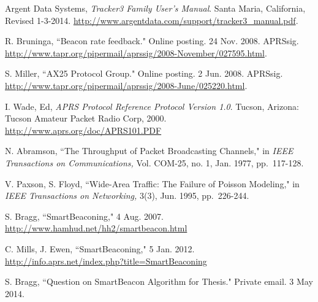 \begin{thebibliography}{99}


		Argent Data Systems,
		\emph{Tracker3 Family User's Manual}.
		Santa Maria, California,
		Revised 1-3-2014.
		\url{http://www.argentdata.com/support/tracker3_manual.pdf}.

		R. Bruninga,
		``Beacon rate feedback."
		Online posting. 24 Nov. 2008. APRSsig.
		\url{http://www.tapr.org/pipermail/aprssig/2008-November/027595.html}.

		S. Miller,
		``AX25 Protocol Group."
		Online posting. 2 Jun. 2008. APRSsig.
		\url{http://www.tapr.org/pipermail/aprssig/2008-June/025220.html}.

		I. Wade, Ed,
		\emph{APRS Protocol Reference Protocol Version 1.0}.
		Tucson, Arizona: Tucson Amateur Packet Radio Corp, 2000. 
		\url{http://www.aprs.org/doc/APRS101.PDF}

		N. Abramson,
		``The Throughput of Packet Broadcasting Channels," in
		\emph{IEEE Transactions on Communications,}
		Vol. COM-25, no. 1, Jan. 1977, pp.~117-128.

		V. Paxson, S. Floyd,
		``Wide-Area Traffic: The Failure of Poisson Modeling," in
		\emph{IEEE Transactions on Networking,}
		3(3), Jun. 1995, pp.~226-244.

		S. Bragg, 
		``SmartBeaconing\texttrademark,"
		4 Aug. 2007.
		\url{http://www.hamhud.net/hh2/smartbeacon.html}

		C. Mills, J. Ewen,
		``SmartBeaconing,"
		5 Jan. 2012.
		\url{http://info.aprs.net/index.php?title=SmartBeaconing}

		S. Bragg, ``Question on SmartBeacon Algorithm for Thesis."
		Private email. 3 May 2014.

\end{thebibliography}

